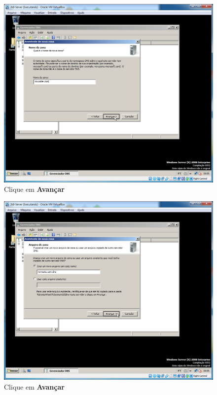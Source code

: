 \documentclass[10pt]{article}
\begin{document}
\begin{figure}[H]
    \centering
    \caption{Clique em \textbf{Avançar}}
    \label{fig:5532005}
    \includegraphics[width=\linewidth]{images/IIS/criando_um_novo_site/005.png}
\end{figure}
\begin{figure}[H]
    \centering
    \caption{Clique em \textbf{Avançar}}
    \label{fig:5532006}
    \includegraphics[width=\linewidth]{images/IIS/criando_um_novo_site/006.png}
\end{figure}
\end{document}
